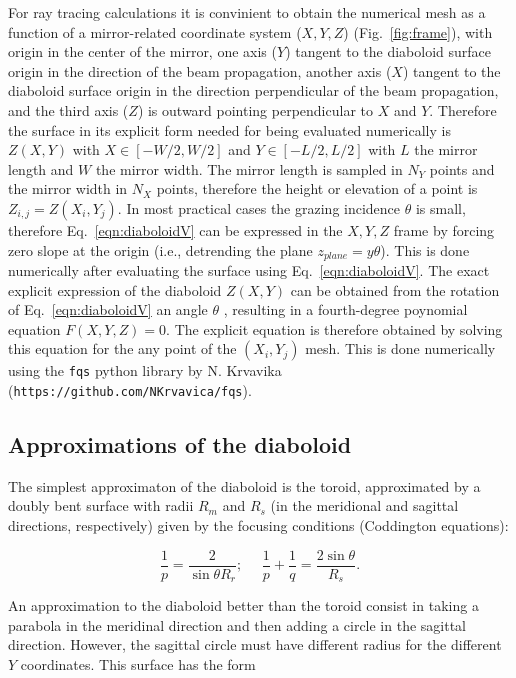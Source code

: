 \documentclass{iucr}              %
\begin{document}
For ray tracing calculations it is convinient to obtain the numerical mesh as a function of a mirror-related coordinate system ($X,Y,Z$) (Fig.~\ref{fig:frame}), with origin in the center of the mirror, one axis ($Y$) tangent to the diaboloid surface origin in the direction of the beam propagation, another axis ($X$) tangent to the diaboloid surface origin in the direction perpendicular of the beam propagation, and the third axis ($Z$) is outward pointing perpendicular to $X$ and $Y$. Therefore the surface in its explicit form needed for being evaluated numerically is $Z(X,Y)$ with $X \in [-W/2, W/2]$ and $Y \in [-L/2, L/2]$ with $L$ the mirror length and $W$ the mirror width. The mirror length is sampled in $N_Y$ points and the mirror width in $N_X$ points, therefore the height or elevation of a point is $Z_{i,j}=Z(X_i,Y_j)$.
In most practical cases the grazing incidence $\theta$ is small, therefore Eq.~\ref{eqn:diaboloidV} can be expressed in the $X,Y,Z$ frame by forcing zero slope at the origin (i.e., detrending the plane $z_{plane}=y \theta$). This is done numerically after evaluating the surface using Eq.~\ref{eqn:diaboloidV}. 
The exact explicit expression of the diaboloid $Z(X,Y)$ can be obtained from the rotation of Eq.~\ref{eqn:diaboloidV} an angle $\theta$ \cite{part2}, resulting in a fourth-degree poynomial equation $F(X,Y,Z)=0$. The explicit equation is therefore obtained by solving this equation for the any point of the $(X_i,Y_j)$ mesh. This is done numerically using the {\tt fqs} python library by N. Krvavika ({\tt https://github.com/NKrvavica/fqs}). 



\subsection{Approximations of the diaboloid}\label{sec:approximations}

The simplest approximaton of the diaboloid is the toroid, approximated by a doubly bent surface with radii $R_m$ and $R_s$ (in the meridional and sagittal directions, respectively) given by the focusing conditions (Coddington equations):

\begin{equation}
\label{eqn:radii}
\frac{1}{p} = \frac{2 }{\sin\theta R_r};~~~~~~
\frac{1}{p} + \frac{1}{q} = \frac{2\sin\theta}{ R_s}.
\end{equation}


An approximation to the diaboloid better than the toroid consist in taking a parabola in the meridinal direction and then adding a circle in the sagittal direction. However, the sagittal circle must have different radius for the different $Y$ coordinates. This surface has the form \cite{part2}
\end{document}
